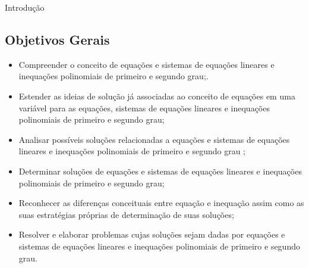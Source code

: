 \begin{apresentacao}{Introdução}
\subsection*{Objetivos Gerais}

\begin{itemize}
\item  Compreender o conceito de equações e sistemas de equações lineares e inequações polinomiais de primeiro e segundo grau;.
\item Estender as ideias de solução já associadas ao conceito de equações em uma variável para as equações, sistemas de equações lineares e inequações polinomiais de primeiro e segundo grau;
\item Analisar possíveis soluções relacionadas a equações e sistemas de equações lineares e inequações polinomiais de primeiro e segundo grau ;
\item Determinar soluções de equações e sistemas de equações lineares e inequações polinomiais de primeiro e segundo grau;
\item Reconhecer as diferenças conceituais entre equação e inequação assim como as suas estratégias próprias de determinação de suas soluções; 
\item Resolver e elaborar problemas cujas soluções sejam dadas por equações e sistemas de equações lineares e inequações polinomiais de primeiro e segundo grau. 
\end{itemize}

\end{apresentacao}

